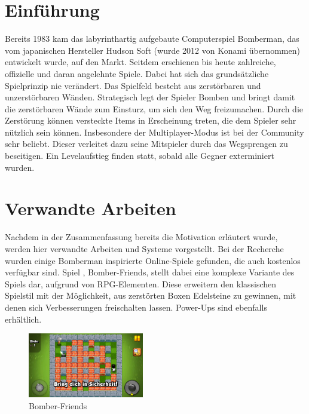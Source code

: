 \documentclass[conference]{IEEEtran}
\begin{document}
\section{Einführung}
Bereits 1983 kam das labyrinthartig aufgebaute Computerspiel \glqq Bomberman\grqq{}, das vom japanischen Hersteller Hudson Soft (wurde 2012 von Konami übernommen) entwickelt wurde, auf den Markt. Seitdem erschienen bis heute zahlreiche, offizielle und daran angelehnte Spiele. Dabei hat sich das grundsätzliche Spielprinzip nie verändert. Das Spielfeld besteht aus zerstörbaren und unzerstörbaren Wänden. Strategisch legt der Spieler Bomben und bringt damit die zerstörbaren Wände zum Einsturz, um sich den Weg freizumachen. Durch die Zerstörung können versteckte Items in Erscheinung treten, die dem Spieler sehr nützlich sein können. Insbesondere der Multiplayer-Modus ist bei der Community sehr beliebt. Dieser verleitet dazu seine Mitspieler durch das Wegsprengen zu beseitigen. Ein Levelaufstieg finden statt, sobald alle Gegner exterminiert wurden.  



\section{Verwandte Arbeiten}
Nachdem in der Zusammenfassung bereits die Motivation erläutert wurde, werden hier verwandte Arbeiten und Systeme vorgestellt. Bei der Recherche wurden einige Bomberman inspirierte Online-Spiele gefunden, die auch kostenlos verfügbar sind. Spiel \cite{bombe-friends}, Bomber-Friends, stellt dabei eine komplexe Variante des Spiels dar, aufgrund von RPG-Elementen. Diese erweitern den klassischen Spielstil mit der Möglichkeit, aus zerstörten Boxen Edelsteine zu gewinnen, mit denen sich Verbesserungen freischalten lassen. Power-Ups sind ebenfalls erhältlich. 
\begin{figure}[H]
    \centering
    \includegraphics[width=0.45\textwidth]{res/bomberfriends.png}
    \caption{Bomber-Friends}
\end{figure}
\end{document}
